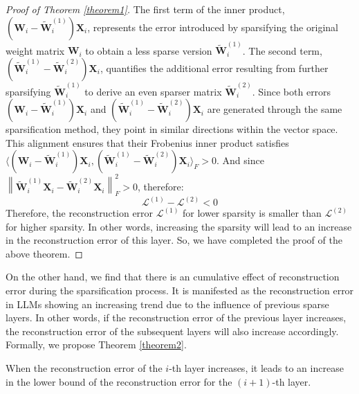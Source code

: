 \begin{proof}[Proof of Theorem \ref{theorem1}]
The first term of the inner product, \((\boldsymbol{W}_i - \widetilde{\boldsymbol{W}}_{i}^{(1)})\boldsymbol{X}_{i}\), represents the error introduced by sparsifying the original weight matrix \(\boldsymbol{W}_i\) to obtain a less sparse version \(\widetilde{\boldsymbol{W}}_{i}^{(1)}\). The second term, \((\widetilde{\boldsymbol{W}}_{i}^{(1)} - \widetilde{\boldsymbol{W}}_{i}^{(2)})\boldsymbol{X}_{i}\), quantifies the additional error resulting from further sparsifying \(\widetilde{\boldsymbol{W}}_{i}^{(1)}\) to derive an even sparser matrix \(\widetilde{\boldsymbol{W}}_{i}^{(2)}\). Since both errors \((\boldsymbol{W}_i - \widetilde{\boldsymbol{W}}_{i}^{(1)})\boldsymbol{X}_{i}\) and \((\widetilde{\boldsymbol{W}}_{i}^{(1)} - \widetilde{\boldsymbol{W}}_{i}^{(2)})\boldsymbol{X}_{i}\) are generated through the same sparsification method, they point in similar directions within the vector space. This alignment ensures that their Frobenius inner product satisfies \(\langle(\boldsymbol{W}_i - \widetilde{\boldsymbol{W}}_{i}^{(1)})\boldsymbol{X}_{i}, (\widetilde{\boldsymbol{W}}_{i}^{(1)} - \widetilde{\boldsymbol{W}}_{i}^{(2)})\boldsymbol{X}_{i} \rangle_F > 0\). And since \(\left\lVert \widetilde{\boldsymbol{W}}_{i}^{(1)}\boldsymbol{X}_{i} - \widetilde{\boldsymbol{W}}_{i}^{(2)}\boldsymbol{X}_{i}\right\rVert^2_F>0 \), therefore:
\begin{equation}
\mathcal{L}^{(1)}-\mathcal{L}^{(2)} < 0
\end{equation}
Therefore, the reconstruction error $\mathcal{L}^{(1)}$ for lower sparsity is smaller than $\mathcal{L}^{(2)}$ for higher sparsity. In other words, increasing the sparsity will lead to an increase in the reconstruction error of this layer. So, we have completed the proof of the above theorem.
\end{proof}

On the other hand, we find that there is an cumulative effect of reconstruction error during the sparsification process. It is manifested as the reconstruction error in LLMs showing an increasing trend due to the influence of previous sparse layers. In other words, if the reconstruction error of the previous layer increases, the reconstruction error of the subsequent layers will also increase accordingly. Formally, we propose Theorem \ref{theorem2}. 
\begin{theorem}\label{theorem2}
When the reconstruction error of the \(i\)-th layer increases, it leads to an increase in the lower bound of the reconstruction error for the \((i+1)\)-th layer.
\end{theorem}

